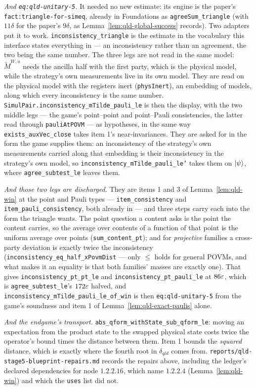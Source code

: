 \emph{And \texttt{eq:qld-unitary-5}.} It needed no new estimate: its engine is the paper's
\texttt{fact:triangle-for-simeq}, already in Foundations as \texttt{agreeSum\_triangle} (with
$11\delta$ for the paper's $9\delta$, as Lemma~\ref{lem:qld-global-success} records). Two
adapters put it to work. \texttt{inconsistency\_triangle} is the estimate in the vocabulary this
interface states everything in --- an inconsistency rather than an agreement, the two being the
same number. The three legs are not read in the same model: $\tilde{M}^{W,u}$ needs the ancilla
half with the first party, which is the physical model, while the strategy's own measurements live
in its own model. They are read on the physical model with the registers inert
(\texttt{physInert}), an embedding of models, along which every inconsistency is the same number.
\texttt{SimulPair.inconsistency\_mTilde\_pauli\_le} is then the display, with the two middle legs
--- the game's point--point and point--Pauli consistencies, the latter read through
\texttt{pauliAtPOVM} --- as hypotheses, in the same way \texttt{exists\_auxVec\_close} takes item
1's near-invariances. They are asked for in the form the game supplies them: an inconsistency of
the strategy's own measurements carried along that embedding is their inconsistency in the
strategy's own model, so \texttt{inconsistency\_mTilde\_pauli\_le'} takes them on $|\psi\rangle$,
where \texttt{agree\_subtest\_le} leaves them.

\emph{And those two legs are discharged.} They are items 1 and 3 of Lemma~\ref{lem:qld-win} at the
point and Pauli types --- \texttt{item\_consistency} and \texttt{item\_pauli\_consistency}, both
already in --- and three steps carry each into the form the triangle wants. The point question a
content asks is the point the content carries, so the average over contents of a function of that
point is the uniform average over points (\texttt{sum\_content\_pt}); and for \emph{projective}
families a cross-party deviation is exactly twice the inconsistency
(\texttt{inconsistency\_eq\_half\_xPovmDist} --- only $\leq$ holds for general POVMs, and what
makes it an equality is that both families' masses are exactly one). That gives
\texttt{inconsistency\_pt\_pt\_le} and \texttt{inconsistency\_pt\_pauli\_le} at $86\varepsilon$,
which is \texttt{agree\_subtest\_le}'s $172\varepsilon$ halved, and
\texttt{inconsistency\_mTilde\_pauli\_le\_of\_win} is then \texttt{eq:qld-unitary-5} from the
game's soundness and item 1 of Lemma~\ref{lem:qld-exact-paulis} alone.

\emph{And the endgame's transport.} \texttt{abs\_qform\_withState\_sub\_qform\_le}: moving an
expectation from the product state to the swapped physical state costs twice the operator's bound
times the distance between them. Item 1 bounds the \emph{squared} distance, which is exactly where
the fourth root in $\delta_{qld}$ comes from. \texttt{reports/qld-stage5-blueprint-repairs.md}
records the repairs above, including the ledger's declared dependencies for node $1.2.2.16$, which
name $1.2.2.4$ (Lemma~\ref{lem:qld-win}) and which the \texttt{uses} list did not.

